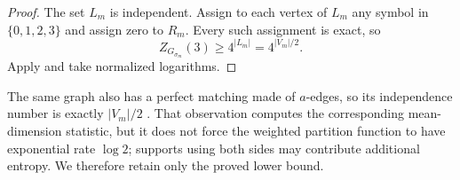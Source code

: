 \begin{proof}
The set $L_m$ is independent.  Assign to each vertex of $L_m$ any symbol in
$\{0,1,2,3\}$ and assign zero to $R_m$.  Every such assignment is exact, so
\[
 Z_{G_{\sigma_m}}(3)\ge4^{|L_m|}=4^{|V_m|/2}.
\]
Apply  and take normalized logarithms.
\end{proof}

The same graph also has a perfect matching made of $a$-edges, so its
independence number is exactly $|V_m|/2$ \citep{LiLiu2026}.  That observation
computes the corresponding mean-dimension statistic, but it does not force
the weighted partition function to have exponential rate $\log2$; supports
using both sides may contribute additional entropy.  We therefore retain only
the proved lower bound.

